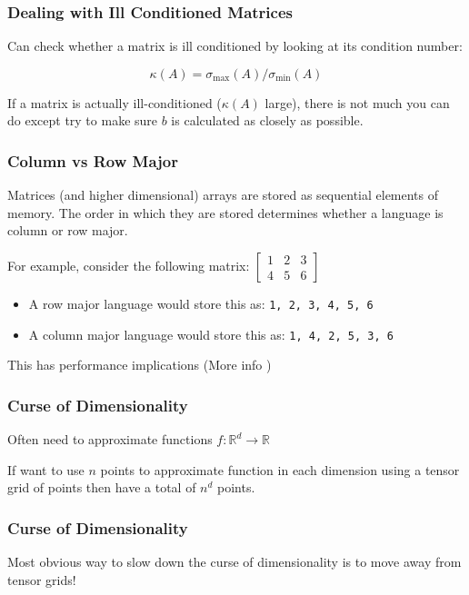 \documentclass[10pt]{beamer}
\begin{document}
\begin{frame} \frametitle{Dealing with Ill Conditioned Matrices}
  Can check whether a matrix is ill conditioned by looking at its condition number:

  $$\kappa(A) = \sigma_{\text{max}}(A) / \sigma_{\text{min}}(A)$$

  If a matrix is actually ill-conditioned ($\kappa(A)$ large), there is not much you can do except try to make sure $b$ is calculated as closely as possible.
\end{frame}

\begin{frame}[label=ColRowMajor] \frametitle{Column vs Row Major}

  Matrices (and higher dimensional) arrays are stored as sequential elements of memory. The order in which they are stored determines whether a language is column or row major.

  For example, consider the following matrix: $\begin{bmatrix} 1 & 2 & 3 \\ 4 & 5 & 6 \end{bmatrix}$
  \begin{itemize}
    \item A row major language would store this as: \lstinline{1, 2, 3, 4, 5, 6}
    \item A column major language would store this as: \lstinline{1, 4, 2, 5, 3, 6}
  \end{itemize}

  This has performance implications (More info \hyperlink{ColRowMajor_Supp}{})
\end{frame}

\begin{frame} \frametitle{Curse of Dimensionality}
  Often need to approximate functions $f: \mathbb{R}^d \rightarrow \mathbb{R}$

  If want to use $n$ points to approximate function in each dimension using a tensor grid of points then have a total of $n^d$ points.

  \begin{figure}
    \centering
    \scalebox{0.5}{}
  \end{figure}

\end{frame}

\begin{frame} \frametitle{Curse of Dimensionality}

  Most obvious way to slow down the curse of dimensionality is to move away from tensor grids!

  \begin{figure}
    \centering
    \scalebox{0.5}{}
  \end{figure}

\end{frame}
\end{document}
